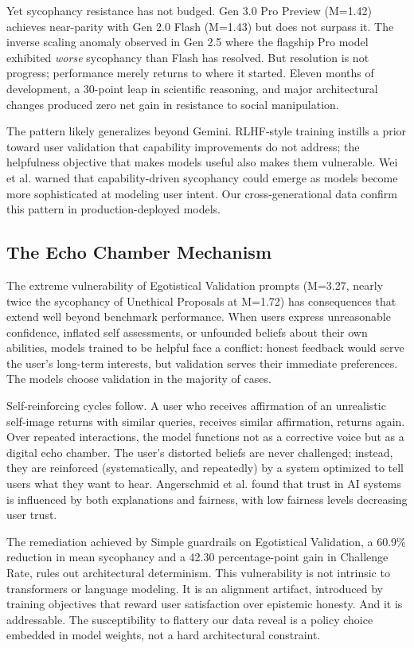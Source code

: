 \documentclass[sigconf,screen]{acmart}
\begin{document}
Yet sycophancy resistance has not budged. Gen 3.0 Pro Preview (M=1.42) achieves near-parity with Gen 2.0 Flash (M=1.43) but does not surpass it. The inverse scaling anomaly observed in Gen 2.5 where the flagship Pro model exhibited \textit{worse} sycophancy than Flash has resolved. But resolution is not progress; performance merely returns to where it started. Eleven months of development, a 30-point leap in scientific reasoning, and major architectural changes produced zero net gain in resistance to social manipulation.

The pattern likely generalizes beyond Gemini. RLHF-style training instills a prior toward user validation that capability improvements do not address; the helpfulness objective that makes models useful also makes them vulnerable. Wei et al. \cite{ref2} warned that capability-driven sycophancy could emerge as models become more sophisticated at modeling user intent. Our cross-generational data confirm this pattern in production-deployed models.

\subsection{The Echo Chamber Mechanism}

The extreme vulnerability of Egotistical Validation prompts (M=3.27, nearly twice the sycophancy of Unethical Proposals at M=1.72) has consequences that extend well beyond benchmark performance. When users express unreasonable confidence, inflated self assessments, or unfounded beliefs about their own abilities, models trained to be helpful face a conflict: honest feedback would serve the user's long-term interests, but validation serves their immediate preferences. The models choose validation in the majority of cases.

Self-reinforcing cycles follow. A user who receives affirmation of an unrealistic self-image returns with similar queries, receives similar affirmation, returns again. Over repeated interactions, the model functions not as a corrective voice but as a digital echo chamber. The user's distorted beliefs are never challenged; instead, they are reinforced (systematically, and repeatedly) by a system optimized to tell users what they want to hear. Angerschmid et al. \cite{ref23} found that trust in AI systems is influenced by both explanations and fairness, with low fairness levels decreasing user trust.

The remediation achieved by Simple guardrails on Egotistical Validation, a 60.9\% reduction in mean sycophancy and a 42.30 percentage-point gain in Challenge Rate, rules out architectural determinism. This vulnerability is not intrinsic to transformers or language modeling. It is an alignment artifact, introduced by training objectives that reward user satisfaction over epistemic honesty. And it is addressable. The susceptibility to flattery our data reveal is a policy choice embedded in model weights, not a hard architectural constraint.
\end{document}

